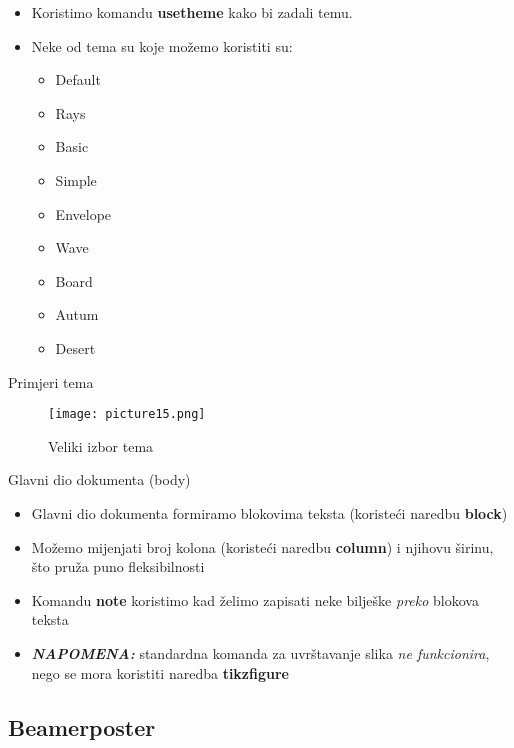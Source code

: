 \documentclass{beamer}
\begin{document}
 \begin{frame}{}
 \begin{itemize}
     \item Koristimo komandu \textbf{usetheme} kako bi zadali temu.
     \item Neke od tema su koje možemo koristiti su: 
     \begin{itemize}
         \item Default		
         \item Rays	
         \item Basic	
         \item Simple
         \item Envelope 
         \item Wave 
         \item Board
         \item Autum 
         \item Desert		
     \end{itemize}
 \end{itemize}   
 \end{frame}

 \begin{frame}{Primjeri tema}
 	      \begin{figure}
 			\texttt{[image: picture15.png]}
 			\caption{Veliki izbor tema}
 	      \end{figure} 
\end{frame}

 \begin{frame}{Glavni dio dokumenta (body)}
 \begin{itemize}
     \item Glavni dio dokumenta formiramo blokovima teksta (koristeći naredbu \textbf{block})
     \item Možemo mijenjati broj kolona (koristeći naredbu \textbf{column}) i njihovu širinu, što pruža puno fleksibilnosti
     \item Komandu \textbf{note} koristimo kad želimo zapisati neke bilješke \textit{preko} blokova teksta
     \item \textbf{\textit{NAPOMENA:}} standardna komanda za uvrštavanje slika \textit{ne funkcionira}, nego se mora koristiti naredba \textbf{tikzfigure}
 \end{itemize}
 \end{frame}
 
 \subsection{Beamerposter}
 
\end{document}
